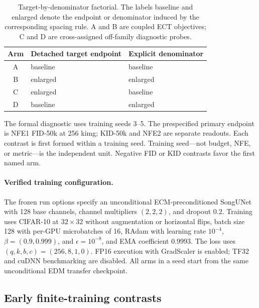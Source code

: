 \documentclass{article}
\newif\ifshowcomments
\newcommand{\empnote}[1]{%
  \ifshowcomments{\color{empiricalgreen}\textbf{[EMPIRICAL CHECK: #1]}}\fi}
\begin{document}
\begin{table}[t]
  \caption{Target-by-denominator factorial. The labels baseline and enlarged
  denote the endpoint or denominator induced by the corresponding spacing
  rule. A and B are coupled ECT objectives; C and D are cross-assigned
  off-family diagnostic probes.}
  \label{tab:arms}
  \centering
  \begin{tabular}{cll}
    \toprule
    Arm & Detached target endpoint & Explicit denominator \\
    \midrule
    A & baseline & baseline \\
    B & enlarged & enlarged \\
    C & enlarged & baseline \\
    D & baseline & enlarged \\
    \bottomrule
  \end{tabular}
\end{table}

The formal diagnostic uses training seeds 3--5. The prespecified primary
endpoint is NFE1 FID-50k at 256 kimg; KID-50k and NFE2 are separate readouts.
Each contrast is first formed within a training seed. Training seed---not
budget, NFE, or metric---is the independent unit. Negative FID or KID
contrasts favor the first named arm.

\paragraph{Verified training configuration.}
The frozen run options specify an unconditional ECM-preconditioned SongUNet
with 128 base channels, channel multipliers $(2,2,2)$, and dropout $0.2$.
Training uses CIFAR-10 at $32\times32$ without augmentation or horizontal
flips, batch size 128 with per-GPU microbatches of 16, RAdam with learning rate
$10^{-4}$, $\beta=(0.9,0.999)$, and $\epsilon=10^{-8}$, and EMA coefficient
$0.9993$. The loss uses $(q,k,b,c)=(256,8,1,0)$. FP16 execution with
GradScaler is enabled; TF32 and cuDNN benchmarking are disabled. All arms in a
seed start from the same unconditional EDM transfer checkpoint.

\empnote{Methods owner: package the accepted evaluator code/digest, detector
identity/digest, and frozen reference-statistic digest in the anonymous
artifact. Sampling and metric seeds, NFE ordering/midpoint, generated-feature
identity, runtime, and hardware are sourced from current records.}

\subsection{Early finite-training contrasts}
\end{document}
